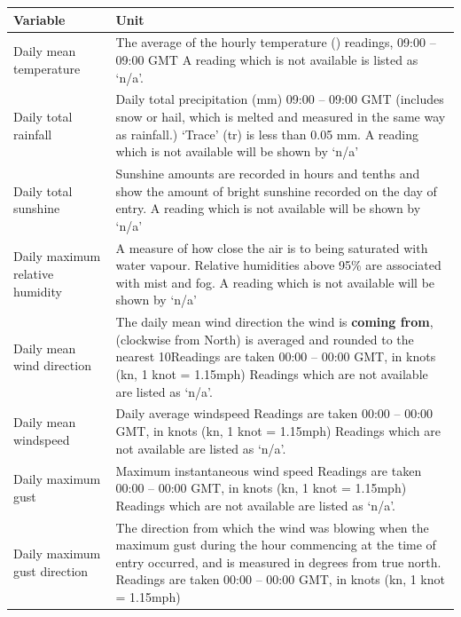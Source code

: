 \documentclass[A4paper, 11pt]{article}
\begin{document}
	\begin{tabular}{|p{5.5cm}|p{11.5cm}|}
		\hline
		\textbf{Variable} & \textbf{Unit} \\
		\hline
		Daily mean temperature & The average of the hourly temperature (\textcelsius) readings, 09:00 – 09:00 GMT \newline A reading which is not available is listed as ‘n/a’.
		 \\
		\hline
		Daily total rainfall & Daily total precipitation (mm) 09:00 – 09:00 GMT
		(includes snow or hail, which is melted and measured in the same way as rainfall.)
		‘Trace’ (tr) is less than 0.05 mm. \newline A reading which is not available will be shown by ‘n/a’
		 \\
		\hline
		Daily total sunshine & Sunshine amounts are recorded in hours and tenths and show the amount of bright sunshine recorded on the day of entry. \newline A reading which is not available will be shown by ‘n/a’ \\
		\hline
		Daily maximum relative humidity & A measure of how close the air is to being saturated with water vapour. \newline Relative humidities above 95\% are associated with mist and fog. \newline A reading which is not available will be shown by ‘n/a’
		 \\
		\hline
		Daily mean wind direction & The daily mean wind direction the wind is \textbf{coming from}, (clockwise from North) is averaged and rounded to the nearest 10\textdegree \newline Readings are taken 00:00 – 00:00 GMT, in knots (kn, 1 knot = 1.15mph) \newline
		Readings which are not available are listed as ‘n/a’.
		  \\
		\hline
		Daily mean windspeed & Daily average windspeed \newline Readings are taken 00:00 – 00:00 GMT, in knots (kn, 1 knot = 1.15mph) \newline
		Readings which are not available are listed as ‘n/a’. \\
		\hline
		Daily maximum gust & Maximum instantaneous wind speed \newline Readings are taken 00:00 – 00:00 GMT, in knots (kn, 1 knot = 1.15mph) \newline
		Readings which are not available are listed as ‘n/a’.  \\
		\hline
		Daily maximum gust direction & The direction from which the wind was blowing when the maximum gust during the hour commencing at the time of entry occurred, and is measured in degrees from true north. \newline Readings are taken 00:00 – 00:00 GMT, in knots (kn, 1 knot = 1.15mph) \newline

\end{tabular}
\end{document}
